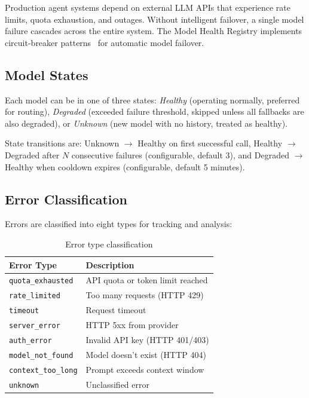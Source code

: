 \documentclass[conference]{IEEEtran}
\begin{document}
Production agent systems depend on external LLM APIs that experience rate limits, quota exhaustion, and outages. Without intelligent failover, a single model failure cascades across the entire system. The Model Health Registry implements circuit-breaker patterns~\cite{ford2000circuit} for automatic model failover.

\subsection{Model States}

Each model can be in one of three states: \textit{Healthy} (operating normally, preferred for routing), \textit{Degraded} (exceeded failure threshold, skipped unless all fallbacks are also degraded), or \textit{Unknown} (new model with no history, treated as healthy).

State transitions are: Unknown $\to$ Healthy on first successful call, Healthy $\to$ Degraded after $N$ consecutive failures (configurable, default 3), and Degraded $\to$ Healthy when cooldown expires (configurable, default 5 minutes).

\subsection{Error Classification}

Errors are classified into eight types for tracking and analysis:

\begin{table}[h]
\centering
\caption{Error type classification}
\label{tab:errors}
\small
\begin{tabular}{ll}
\toprule
\textbf{Error Type} & \textbf{Description} \\
\midrule
\texttt{quota\_exhausted} & API quota or token limit reached \\
\texttt{rate\_limited} & Too many requests (HTTP 429) \\
\texttt{timeout} & Request timeout \\
\texttt{server\_error} & HTTP 5xx from provider \\
\texttt{auth\_error} & Invalid API key (HTTP 401/403) \\
\texttt{model\_not\_found} & Model doesn't exist (HTTP 404) \\
\texttt{context\_too\_long} & Prompt exceeds context window \\
\texttt{unknown} & Unclassified error \\
\bottomrule
\end{tabular}
\end{table}
\end{document}
